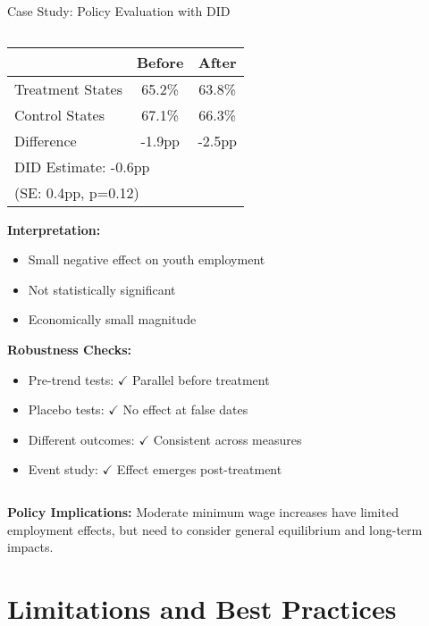 \documentclass[aspectratio=169,11pt]{beamer}
\begin{document}
\begin{frame}{Case Study: Policy Evaluation with DID}
\begin{columns}
\begin{column}{0.5\textwidth}
\begin{table}
\centering
\small
\begin{tabular}{lcc}
\toprule
& \textbf{Before} & \textbf{After} \\
\midrule
Treatment States & 65.2\% & 63.8\% \\
Control States & 67.1\% & 66.3\% \\
\midrule
Difference & -1.9pp & -2.5pp \\
\midrule
\multicolumn{3}{l}{DID Estimate: -0.6pp} \\
\multicolumn{3}{l}{(SE: 0.4pp, p=0.12)} \\
\bottomrule
\end{tabular}
\end{table}

\textbf{Interpretation:}
\begin{itemize}
\item Small negative effect on youth employment
\item Not statistically significant
\item Economically small magnitude
\end{itemize}

\vspace{0.3cm}
\textbf{Robustness Checks:}
\begin{itemize}
\item Pre-trend tests: \(\checkmark\) Parallel before treatment
\item Placebo tests: \(\checkmark\) No effect at false dates
\item Different outcomes: \(\checkmark\) Consistent across measures
\item Event study: \(\checkmark\) Effect emerges post-treatment
\end{itemize}
\end{column}
\end{columns}

\textbf{Policy Implications:} Moderate minimum wage increases have limited employment effects, but need to consider general equilibrium and long-term impacts.
\end{frame}

\section{Limitations and Best Practices}
\end{document}
